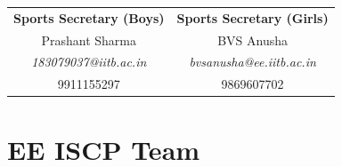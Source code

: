 \documentclass[openany]{book} %
\newcommand{\sectionlinetwo}[2]{%
  \nointerlineskip \vspace{.5\baselineskip}\hspace{\fill}
  {\resizebox{0.5\linewidth}{1.2ex}
    {\pgfornament[color = #1]{#2}
    }}%
    \hspace{\fill}
    \par\nointerlineskip \vspace{.5\baselineskip}
  }
\begin{document}
\bigbreak
\begin{center}
	\begin{tabular}{cc}
		  \textbf{Sports Secretary (Boys)}      &     \textbf{Sports Secretary (Girls)}\\
		         Prashant Sharma                &               BVS Anusha \\
		\textit{183079037@iitb.ac.in} &\textit{bvsanusha@ee.iitb.ac.in} \\
		            9911155297                  &                    9869607702 \\
	\end{tabular}
\end{center}
\sectionlinetwo{magenta}{88}

\newpage
\section{EE ISCP Team}
\end{document}
